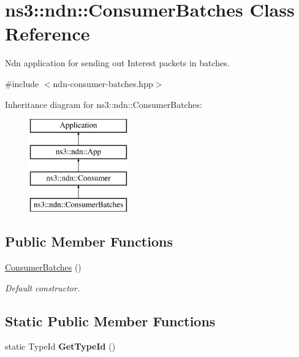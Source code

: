 \hypertarget{classns3_1_1ndn_1_1ConsumerBatches}{}\section{ns3\+:\+:ndn\+:\+:Consumer\+Batches Class Reference}
\label{classns3_1_1ndn_1_1ConsumerBatches}


Ndn application for sending out Interest packets in batches.  




{\ttfamily \#include $<$ndn-\/consumer-\/batches.\+hpp$>$}

Inheritance diagram for ns3\+:\+:ndn\+:\+:Consumer\+Batches\+:\begin{figure}[H]
\begin{center}
\leavevmode
\includegraphics[height=4.000000cm]{classns3_1_1ndn_1_1ConsumerBatches}
\end{center}
\end{figure}
\subsection*{Public Member Functions}
\begin{DoxyCompactItemize}
\item 
\hyperlink{classns3_1_1ndn_1_1ConsumerBatches_a1413ba697798ceed9db92587d2244194}{Consumer\+Batches} ()\hypertarget{classns3_1_1ndn_1_1ConsumerBatches_a1413ba697798ceed9db92587d2244194}{}\label{classns3_1_1ndn_1_1ConsumerBatches_a1413ba697798ceed9db92587d2244194}

\begin{DoxyCompactList}\small\item\em Default constructor. \end{DoxyCompactList}\end{DoxyCompactItemize}
\subsection*{Static Public Member Functions}
\begin{DoxyCompactItemize}
\item 
static Type\+Id {\bfseries Get\+Type\+Id} ()\hypertarget{classns3_1_1ndn_1_1ConsumerBatches_a3fc13e37c1c0b9d3f87c46440d283097}{}\label{classns3_1_1ndn_1_1ConsumerBatches_a3fc13e37c1c0b9d3f87c46440d283097}

\end{DoxyCompactItemize}
